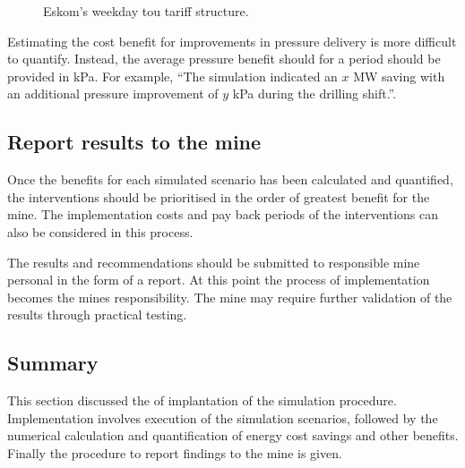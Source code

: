 		\begin{figure}[h]
			\centering
			
			\caption[Eskom's weekday TOU tariff structure.]{Eskom's weekday \gls{tou} tariff structure.\protect \footnotemark[1]}
			\label{fig: Tariff}
		\end{figure}
		
		Estimating the cost benefit for improvements in pressure delivery is more difficult to quantify. Instead, the average pressure benefit should for a period should be provided in kPa. For example, \enquote{The simulation indicated an $x$ MW saving with an additional pressure improvement of $y$ kPa during the drilling shift.}.

		\subsection{Report results to the mine}
		Once the benefits for each simulated scenario has been calculated and quantified, the interventions should be prioritised in the order of greatest benefit for the mine. The implementation costs and pay back periods of the interventions can also be considered in this process.
		\par
		The results and recommendations should be submitted to responsible mine personal in the form of a report. At this point the process of implementation becomes the mines responsibility. The mine may require further validation of the results through practical testing.

	\subsection{Summary}
	This section discussed the of implantation of the simulation procedure. Implementation involves execution of the simulation scenarios, followed by the numerical calculation and quantification of energy cost savings and other benefits. Finally the procedure to report findings to the mine is given.
